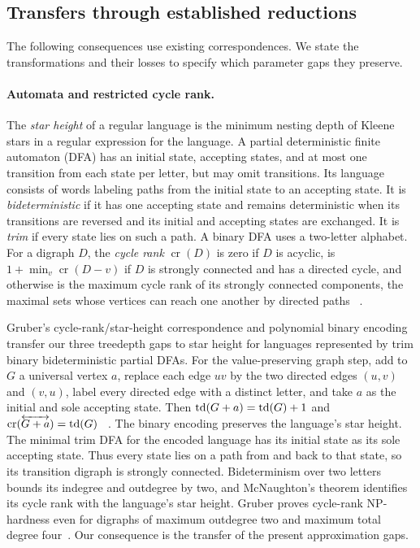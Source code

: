 \subsection{Transfers through established reductions}

The following consequences use existing correspondences. We state
the transformations and their losses to specify which parameter
gaps they preserve.

\paragraph{Automata and restricted cycle rank.}
The \emph{star height} of a regular language is the minimum nesting
depth of Kleene stars in a regular expression for the language.
A partial deterministic finite automaton (DFA) has an initial state,
accepting states, and at most one transition from each state per
letter, but may omit transitions. Its language consists of words labeling paths
from the initial state to an accepting state. It is
\emph{bideterministic} if it has one accepting state and remains
deterministic when its transitions are reversed and its initial and
accepting states are exchanged. It is \emph{trim} if every state lies
on such a path. A binary DFA uses a two-letter alphabet. For a digraph
$D$, the \emph{cycle rank} $\operatorname{cr}(D)$ is zero if $D$ is
acyclic, is $1+\min_v\operatorname{cr}(D-v)$ if $D$ is strongly
connected and has a directed cycle, and otherwise is the maximum
cycle rank of its strongly connected components, the maximal sets
whose vertices can reach one another by directed paths
~\cite[Sections~2--3]{Gruber2008}.

Gruber's cycle-rank/star-height correspondence and polynomial binary
encoding~\cite[Theorems 20 and 23]{Gruber2008} transfer our three
treedepth gaps to star height for languages represented by trim binary
bideterministic partial DFAs. For the value-preserving graph step,
add to $G$ a universal vertex $a$, replace each edge $uv$ by the two
directed edges $(u,v)$ and $(v,u)$, label every directed edge with a distinct letter, and take $a$
as the initial and sole accepting state. Then
$\operatorname{td}(G+a)=\operatorname{td}(G)+1$ and
$\operatorname{cr}(\overleftrightarrow{G+a})=\operatorname{td}(G)$
~\cite[proof of Theorem~12]{Gruber2008}. The binary encoding
preserves the language's star height. The minimal trim DFA for the
encoded language has its initial state as its sole accepting state.
Thus every state lies on a path from and back to that state, so its
transition digraph is strongly connected. Bideterminism over two
letters bounds its indegree and outdegree by two, and McNaughton's
theorem identifies its cycle rank with the language's star height.
Gruber proves cycle-rank \textup{NP}-hardness
even for digraphs of maximum outdegree two and maximum total degree
four~\cite[Corollary 24]{Gruber2008}. Our consequence is the transfer
of the present approximation gaps.

